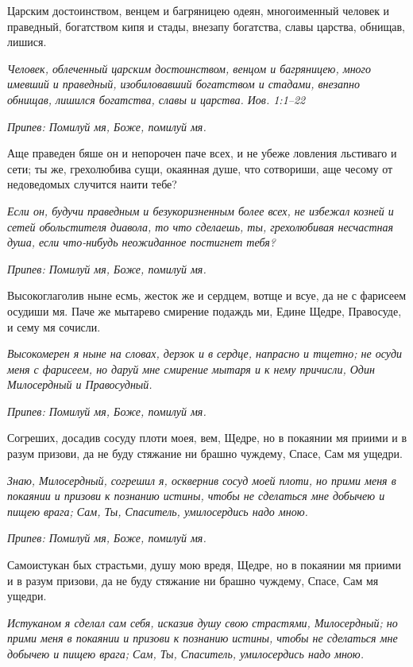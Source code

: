 Царским достоинством, венцем и багряницею одеян, многоименный человек и праведный, богатством кипя и стады, внезапу богатства, славы царства, обнищав, лишися.


\itshape Человек, облеченный царским достоинством, венцом и багряницею, много имевший и праведный, изобиловавший богатством и стадами, внезапно обнищав, лишился богатства, славы и царства. Иов. 1:1–22\normalfont{}


\itshape Припев:\normalfont{} Помилуй мя, Боже, помилуй мя.


Аще праведен бяше он и непорочен паче всех, и не убеже ловления льстиваго и сети; ты же, грехолюбива сущи, окаянная душе, что сотвориши, аще чесому от недоведомых случится наити тебе?


\itshape Если он, будучи праведным и безукоризненным более всех, не избежал козней и сетей обольстителя диавола, то что сделаешь, ты, грехолюбивая несчастная душа, если что-нибудь неожиданное постигнет тебя?\normalfont{}


\itshape Припев:\normalfont{} Помилуй мя, Боже, помилуй мя.


Высокоглаголив ныне есмь, жесток же и сердцем, вотще и всуе, да не с фарисеем осудиши мя. Паче же мытарево смирение подаждь ми, Едине Щедре, Правосуде, и сему мя сочисли.


\itshape Высокомерен я ныне на словах, дерзок и в сердце, напрасно и тщетно; не осуди меня с фарисеем, но даруй мне смирение мытаря и к нему причисли, Один Милосердный и Правосудный.\normalfont{}


\itshape Припев:\normalfont{} Помилуй мя, Боже, помилуй мя.


Согреших, досадив сосуду плоти моея, вем, Щедре, но в покаянии мя приими и в разум призови, да не буду стяжание ни брашно чуждему, Спасе, Сам мя ущедри.


\itshape Знаю, Милосердный, согрешил я, осквернив сосуд моей плоти, но прими меня в покаянии и призови к познанию истины, чтобы не сделаться мне добычею и пищею врага; Сам, Ты, Спаситель, умилосердись надо мною.\normalfont{}


\itshape Припев:\normalfont{} Помилуй мя, Боже, помилуй мя.


Самоистукан бых страстьми, душу мою вредя, Щедре, но в покаянии мя приими и в разум призови, да не буду стяжание ни брашно чуждему, Спасе, Сам мя ущедри.


\itshape Истуканом я сделал сам себя, исказив душу свою страстями, Милосердный; но прими меня в покаянии и призови к познанию истины, чтобы не сделаться мне добычею и пищею врага; Сам, Ты, Спаситель, умилосердись надо мною.\normalfont{}


